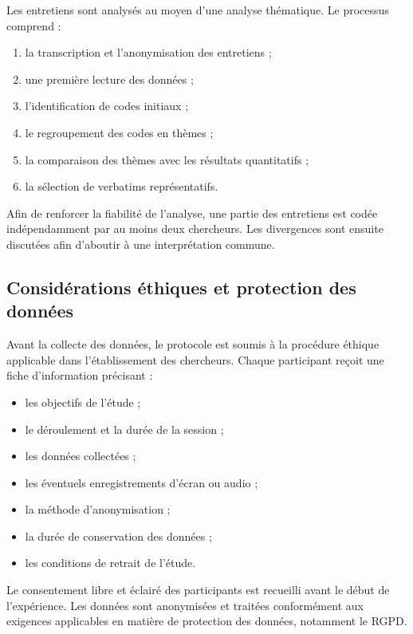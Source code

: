 Les entretiens sont analysés au moyen d'une analyse thématique. Le
processus comprend :

\begin{enumerate}
    \item la transcription et l'anonymisation des entretiens ;
    \item une première lecture des données ;
    \item l'identification de codes initiaux ;
    \item le regroupement des codes en thèmes ;
    \item la comparaison des thèmes avec les résultats quantitatifs ;
    \item la sélection de verbatims représentatifs.
\end{enumerate}

Afin de renforcer la fiabilité de l'analyse, une partie des entretiens
est codée indépendamment par au moins deux chercheurs. Les divergences
sont ensuite discutées afin d'aboutir à une interprétation commune.


\subsection{Considérations éthiques et protection des données}
\label{subsec:ethique-participants}

Avant la collecte des données, le protocole est soumis à la procédure
éthique applicable dans l'établissement des chercheurs. Chaque
participant reçoit une fiche d'information précisant :

\begin{itemize}
    \item les objectifs de l'étude ;
    \item le déroulement et la durée de la session ;
    \item les données collectées ;
    \item les éventuels enregistrements d'écran ou audio ;
    \item la méthode d'anonymisation ;
    \item la durée de conservation des données ;
    \item les conditions de retrait de l'étude.
\end{itemize}

Le consentement libre et éclairé des participants est recueilli avant
le début de l'expérience. Les données sont anonymisées et traitées
conformément aux exigences applicables en matière de protection des
données, notamment le RGPD.


